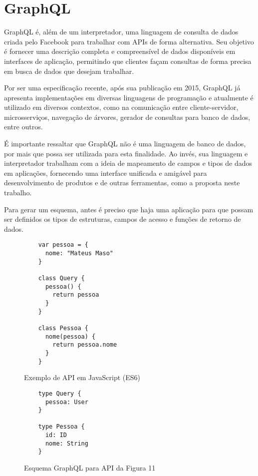 \chapter{GraphQL}

GraphQL é, além de um interpretador, uma linguagem de consulta de dados criada pelo Facebook para trabalhar com APIs de forma alternativa. Seu objetivo é fornecer uma descrição completa e compreensível de dados disponíveis em interfaces de aplicação, permitindo que clientes façam consultas de forma precisa em busca de dados que desejam trabalhar. \cite{GraphQL2016}

Por ser uma especificação recente, após sua publicação em 2015, GraphQL já apresenta implementações em diversas linguagens de programação e atualmente é utilizado em diversos contextos, como na comunicação entre cliente-servidor, microsserviços, navegação de árvores, gerador de consultas para banco de dados, entre outros.

É importante ressaltar que GraphQL não é uma linguagem de banco de dados, por mais que possa ser utilizada para esta finalidade. Ao invés, sua linguagem e interpretador trabalham com a ideia de mapeamento de campos e tipos de dados em aplicações, fornecendo uma interface unificada e amigável para desenvolvimento de produtos e de outras ferramentas, como a proposta neste trabalho. \cite{GraphQL2016}

Para gerar um esquema, antes é preciso que haja uma aplicação para que possam ser definidos os tipos de estruturas, campos de acesso e funções de retorno de dados.

\begin{figure}[H]
  \centering
  \begin{verbatim}
    var pessoa = {
      nome: "Mateus Maso"
    }

    class Query {
      pessoa() {
        return pessoa
      }
    }

    class Pessoa {
      nome(pessoa) {
        return pessoa.nome
      }
    }
  \end{verbatim}
  \caption{Exemplo de API em JavaScript (ES6)}
\end{figure}

\begin{figure}[H]
  \centering
  \begin{verbatim}
    type Query {
      pessoa: User
    }

    type Pessoa {
      id: ID
      nome: String
    }
  \end{verbatim}
  \caption{Esquema GraphQL para API da Figura 11}
\end{figure}

